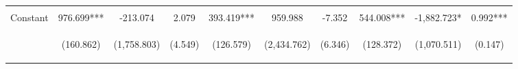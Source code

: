\begin{center}
\begin{tabular}{lccccccccc}
\vspace{4pt} & \begin{footnotesize}[0.072]\end{footnotesize} & \begin{footnotesize}[0.181]\end{footnotesize} & \begin{footnotesize}[0.985]\end{footnotesize} & \begin{footnotesize}[0.404]\end{footnotesize} & \begin{footnotesize}[0.415]\end{footnotesize} & \begin{footnotesize}[0.653]\end{footnotesize} & \begin{footnotesize}[0.940]\end{footnotesize} & \begin{footnotesize}[0.201]\end{footnotesize} & \begin{footnotesize}[0.305]\end{footnotesize} \\
Constant & 976.699*** & -213.074 & 2.079 & 393.419*** & 959.988 & -7.352 & 544.008*** & -1,882.723* & 0.992*** \\
 & \begin{footnotesize}(160.862)\end{footnotesize} & \begin{footnotesize}(1,758.803)\end{footnotesize} & \begin{footnotesize}(4.549)\end{footnotesize} & \begin{footnotesize}(126.579)\end{footnotesize} & \begin{footnotesize}(2,434.762)\end{footnotesize} & \begin{footnotesize}(6.346)\end{footnotesize} & \begin{footnotesize}(128.372)\end{footnotesize} & \begin{footnotesize}(1,070.511)\end{footnotesize} & \begin{footnotesize}(0.147)\end{footnotesize} \\

\end{tabular}
\end{center}
